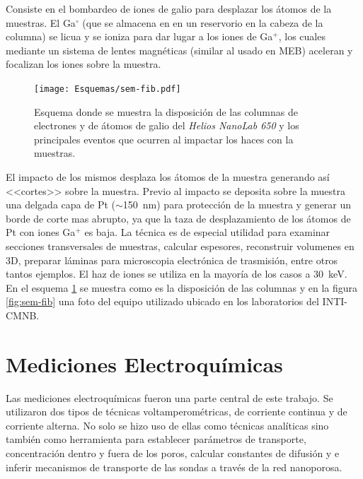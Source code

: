 		Consiste en el bombardeo de iones de galio para desplazar los átomos de la muestras. El Ga$^{\circ}$ (que se almacena en en un reservorio en la cabeza de la columna) se licua y se ioniza para dar lugar a los iones de Ga${^+}$, los cuales mediante un sistema de lentes magnéticas (similar al usado en MEB)  aceleran y focalizan los iones sobre la muestra. 

		\begin{figure}[ht!]
			 		  \begin{center}
			 		  \texttt{[image: Esquemas/sem-fib.pdf]}
			 		  \caption[Esquema de las microscopias FIB/SEM]{Esquema donde se muestra la disposición de las columnas de electrones y de átomos de galio del \textit{Helios NanoLab 650} y los principales eventos que ocurren al impactar los haces con la muestras.}
			 		  \label{esq:sem-fib}
			 		  \end{center}
			 		  \end{figure}

		El impacto de los mismos desplaza los átomos de la muestra generando así <<cortes>> sobre la muestra. Previo al impacto se deposita sobre la muestra una delgada capa de Pt ($\sim$\SI{150}{\nm}) para protección de la muestra y generar un borde de corte mas abrupto, ya que la taza de desplazamiento de los átomos de Pt con iones Ga${^+}$ es baja.\cite{Giannuzzi2005,Orloff1996} La técnica es de especial utilidad para examinar secciones transversales de muestras, calcular espesores, reconstruir volumenes en 3D, preparar láminas para microscopia electrónica de trasmisión, entre otros tantos ejemplos. El haz de iones se utiliza en la mayoría de los casos a \SI{30}{\kilo\electronvolt}. En el esquema \ref{esq:sem-fib} se muestra como es la disposición de las columnas y en la figura \ref{fig:sem-fib} una foto del equipo utilizado ubicado en los laboratorios del INTI-CMNB.\cite{Orloff2003,Reyntjens2001}

\section{Mediciones Electroquímicas}\label{sec:medidas_eq}
		
			Las mediciones electroquímicas fueron una parte central de este trabajo. Se utilizaron dos tipos de técnicas voltamperométricas, de corriente continua y de corriente alterna. No solo se hizo uso de ellas como técnicas analíticas sino también como herramienta para establecer parámetros de transporte, concentración dentro y fuera de los poros, calcular constantes de difusión y e inferir mecanismos de transporte de las sondas a través de la red nanoporosa. 

